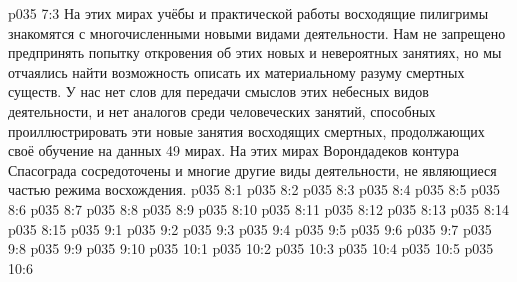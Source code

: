 \vs p035 7:3 На этих мирах учёбы и практической работы восходящие пилигримы знакомятся с многочисленными новыми видами деятельности. Нам не запрещено предпринять попытку откровения об этих новых и невероятных занятиях, но мы отчаялись найти возможность описать их материальному разуму смертных существ. У нас нет слов для передачи смыслов этих небесных видов деятельности, и нет аналогов среди человеческих занятий, способных проиллюстрировать эти новые занятия восходящих смертных, продолжающих своё обучение на данных 49 мирах. На этих мирах Ворондадеков контура Спасограда сосредоточены и многие другие виды деятельности, не являющиеся частью режима восхождения.
\vs p035 8:1 
\vs p035 8:2 
\vs p035 8:3 
\vs p035 8:4 
\vs p035 8:5 
\vs p035 8:6 
\vs p035 8:7 \pc 
\vs p035 8:8 
\vs p035 8:9 \pc 
\vs p035 8:10 
\vs p035 8:11 
\vs p035 8:12 
\vs p035 8:13 
\vs p035 8:14 
\vs p035 8:15 \pc 
{}
\vs p035 9:1 
\vs p035 9:2 
\vs p035 9:3 
\vs p035 9:4 
\vs p035 9:5 \pc 
\vs p035 9:6 
\vs p035 9:7 
\vs p035 9:8 
\vs p035 9:9 \pc 
\vs p035 9:10 
\vs p035 10:1 
\vs p035 10:2 
\vs p035 10:3 
\vs p035 10:4 \pc 
\vs p035 10:5 \pc 
\vsetoff
\vs p035 10:6 
\quizlink
